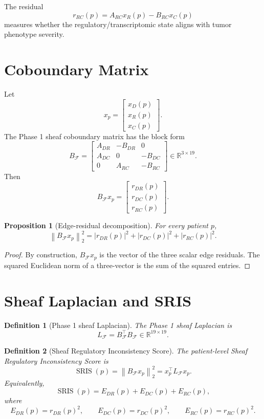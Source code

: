 \documentclass[11pt]{article}
\newtheorem{definition}{Definition}[section]
\newtheorem{proposition}{Proposition}[section]
\newcommand{\R}{\mathbb{R}}
\newcommand{\BF}{B_{\mathcal{F}}}
\newcommand{\LF}{L_{\mathcal{F}}}
\newcommand{\SRIS}{\operatorname{SRIS}}
\newcommand{\norm}[1]{\left\lVert #1 \right\rVert}
\begin{document}
The residual
\[
r_{RC}(p)=A_{RC}x_R(p)-B_{RC}x_C(p)
\]
measures whether the regulatory/transcriptomic state aligns with tumor phenotype severity.

\section{Coboundary Matrix}

Let
\[
x_p=\begin{bmatrix}x_D(p)\\x_R(p)\\x_C(p)\end{bmatrix}.
\]
The Phase 1 sheaf coboundary matrix has the block form
\[
\BF=
\begin{bmatrix}
A_{DR} & -B_{DR} & 0\\
A_{DC} & 0 & -B_{DC}\\
0 & A_{RC} & -B_{RC}
\end{bmatrix}
\in\R^{3\times 19}.
\]
Then
\[
\BF x_p=
\begin{bmatrix}
r_{DR}(p)\\
r_{DC}(p)\\
r_{RC}(p)
\end{bmatrix}.
\]

\begin{proposition}[Edge-residual decomposition]
For every patient $p$,
\[
\norm{\BF x_p}_2^2
=
|r_{DR}(p)|^2+|r_{DC}(p)|^2+|r_{RC}(p)|^2.
\]
\end{proposition}

\begin{proof}
By construction, $\BF x_p$ is the vector of the three scalar edge residuals.  The squared Euclidean norm of a three-vector is the sum of the squared entries.
\end{proof}

\section{Sheaf Laplacian and SRIS}

\begin{definition}[Phase 1 sheaf Laplacian]
The Phase 1 sheaf Laplacian is
\[
\LF=\BF^\top\BF\in\R^{19\times 19}.
\]
\end{definition}

\begin{definition}[Sheaf Regulatory Inconsistency Score]
The patient-level Sheaf Regulatory Inconsistency Score is
\[
\SRIS(p)=\norm{\BF x_p}_2^2=x_p^\top\LF x_p.
\]
Equivalently,
\[
\SRIS(p)=E_{DR}(p)+E_{DC}(p)+E_{RC}(p),
\]
where
\[
E_{DR}(p)=r_{DR}(p)^2,
\qquad
E_{DC}(p)=r_{DC}(p)^2,
\qquad
E_{RC}(p)=r_{RC}(p)^2.
\]
\end{definition}
\end{document}
